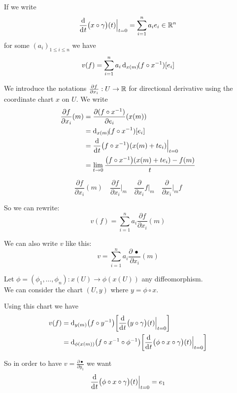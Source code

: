 		If we write
		$$
			\frac{\d}{\di{t}} \big( x \circ \gamma \big)(t) \Big|_{t=0} = \sum_{i=1}^n a_i e_i \in \R^n
		$$
		for some $(a_i)_{1 \leq i \leq n}$ we have
		$$
			v(f) = \sum_{i=1}^n a_i \di[x(m)](f \circ x^{-1})[e_i]
		$$

		We introduce the notations $\frac{\partial{f}}{\partial{x_i}}: U \to \mathbb{R}$ for directional derivative using the coordinate chart $x$ on $U$. We write
		\begin{align*}
			\frac{\partial{f}}{\partial{x_i}}(m) &= \frac{\partial{(f \circ x^{-1})}}{\partial{e_i}}(x(m)) \\
			                                     &= \di[x(m)](f \circ x^{-1})[e_i] \\
			                                     &= \frac{\d}{\di{t}} \big( f \circ x^{-1} \big)(x(m) + t e_i) \Big|_{t=0} \\
			                                     &= \lim_{t \to 0} \frac{\big( f \circ x^{-1} \big)(x(m) + t e_i) - f(m)}{t}
		\end{align*}

		$$
			\frac{\partial{f}}{\partial{x_i}}(m) \quad \frac{\partial{f}}{\partial{x_i}}\Big|_m \quad \frac{\partial}{\partial{x_i}} f \Big|_m \quad \frac{\partial}{\partial{x_i}} \Big|_m f
		$$

		So we can rewrite:
		$$
			v(f) = \sum_{i=1}^n a_i \frac{\partial f}{\partial{x_i}}(m)
		$$

		We can also write $v$ like this:
		$$
			v = \sum_{i=1}^n a_i \frac{\partial \,\bullet\,}{\partial{x_i}}(m)
		$$

		Let $\phi = (\phi_1, \ldots, \phi_n): x(U) \to \phi(x(U))$ any diffeomorphism.\\
		We can consider the chart $(U, y)$ where $y = \phi \circ x$.

		Using this chart we have
		\begin{align*}
			v(f) &= \di[y(m)] \big( f \circ y^{-1} \big) \bigg[ \frac{\d}{\di{t}} \big( y \circ \gamma \big)(t) \Big|_{t=0} \bigg] \\
			     &= \di[\phi(x(m))] \big( f \circ x^{-1} \circ \phi^{-1} \big) \bigg[ \frac{\d}{\di{t}} \big( \phi \circ x \circ \gamma \big)(t) \Big|_{t=0} \bigg]
		\end{align*}

		So in order to have $v = \frac{\partial{\bullet}}{\partial{y_1}}$ we want
		$$
			\frac{\d}{\di{t}} \big( \phi \circ x \circ \gamma \big)(t) \Big|_{t=0} = e_1
		$$

